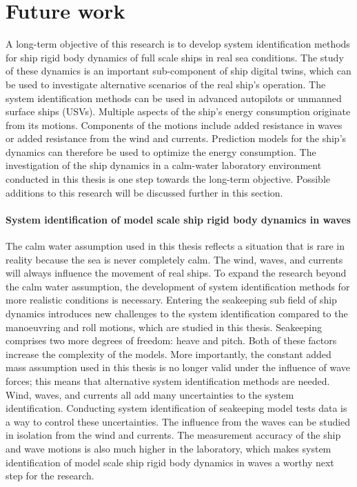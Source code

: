 \chapter{Future work\label{ch:future_work}}
A long-term objective of this research is to develop system identification methods for ship rigid body dynamics of full scale ships in real sea conditions. The study of these dynamics is an important sub-component of ship digital twins, which can be used to investigate alternative scenarios of the real ship's operation. The system identification methods can be used in advanced autopilots or unmanned surface ships (USVs). Multiple aspects of the ship's energy consumption originate from its motions. Components of the motions include added resistance in waves or added resistance from the wind and currents. Prediction models for the ship's dynamics can therefore be used to optimize the energy consumption. The investigation of the ship dynamics in a calm-water laboratory environment conducted in this thesis is one step towards the long-term objective. Possible additions to this research will be discussed further in this section.  

\subsubsection*{System identification of model scale ship rigid body dynamics in waves}
The calm water assumption used in this thesis reflects a situation that is rare in reality because the sea is never completely calm. The wind, waves, and currents will always influence the movement of real ships. To expand the research beyond the calm water assumption, the development of system identification methods for more realistic conditions is necessary. Entering the seakeeping sub field of ship dynamics introduces new challenges to the system identification compared to the manoeuvring and roll motions, which are studied in this thesis. Seakeeping comprises two more degrees of freedom: heave and pitch. Both of these factors increase the complexity of the models. More importantly, the constant added mass assumption used in this thesis is no longer valid under the influence of wave forces; this means that alternative system identification methods are needed. Wind, waves, and currents all add many uncertainties to the system identification. Conducting system identification of seakeeping model tests data is a way to control these uncertainties. The influence from the waves can be studied in isolation from the wind and currents. The measurement accuracy of the ship and wave motions is also much higher in the laboratory, which makes system identification of model scale ship rigid body dynamics in waves a worthy next step for the research.  

